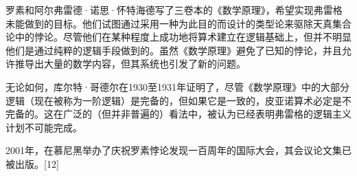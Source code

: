 罗素和阿尔弗雷德·诺思·怀特海德写了三卷本的《数学原理》，希望实现弗雷格未能做到的目标。他们试图通过采用一种为此目的而设计的类型论来驱除天真集合论中的悖论。尽管他们在某种程度上成功地将算术建立在逻辑基础上，但并不明显他们是通过纯粹的逻辑手段做到的。虽然《数学原理》避免了已知的悖论，并且允许推导出大量的数学内容，但其系统也引发了新的问题。

无论如何，库尔特·哥德尔在1930至1931年证明了，尽管《数学原理》中的大部分逻辑（现在被称为一阶逻辑）是完备的，但如果它是一致的，皮亚诺算术必定是不完备的。这在广泛的（但并非普遍的）看法中，被认为已经表明弗雷格的逻辑主义计划不可能完成。

2001年，在慕尼黑举办了庆祝罗素悖论发现一百周年的国际大会，其会议论文集已被出版。[12]

